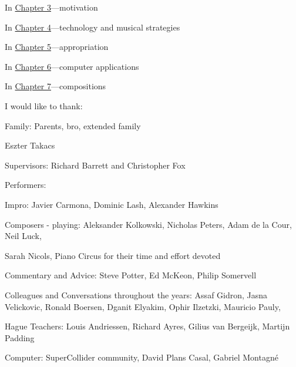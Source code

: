 In \hyperlink{chapter3}{Chapter 3}---motivation

In \hyperlink{chapter4}{Chapter 4}---technology and musical strategies 

In \hyperlink{chapter5}{Chapter 5}---appropriation

In \hyperlink{chapter6}{Chapter 6}---computer applications

In \hyperlink{chapter7}{Chapter 7}---compositions

I would like to thank:

Family: Parents, bro, extended family 

Eszter Takacs

Supervisors: Richard Barrett and Christopher Fox

Performers: 

Impro: Javier Carmona, Dominic Lash, Alexander Hawkins

Composers - playing: Aleksander Kolkowski, Nicholas Peters, Adam de la Cour, Neil Luck, 

Sarah Nicols, Piano Circus for their time and effort devoted

Commentary and Advice: Steve Potter, Ed McKeon, Philip Somervell

Colleagues and Conversations throughout the years:  Assaf Gidron, Jasna Velickovic, Ronald Boersen, Dganit Elyakim, Ophir Ilzetzki, Mauricio Pauly, 

Hague Teachers: Louis Andriessen, Richard Ayres, Gilius van Bergeijk, Martijn Padding

Computer: SuperCollider community, David Plans Casal, Gabriel Montagn\'e

\label{ch:preface}